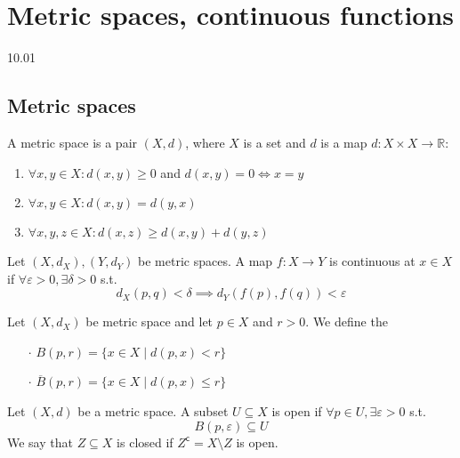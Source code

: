 \section{Metric spaces, continuous functions}
10.01

\subsection{Metric spaces}

\begin{definition}
  A metric space is a pair \( (X, d) \), where \( X \) is a set
  and \( d \) is a map \( d: X \times X \to \mathbb{R} \):
  \begin{enumerate}
    \item \( \forall x, y \in X : d(x, y) \ge 0 \) and \( d(x, y) = 0 \iff x = y \)
    \item \( \forall x, y \in X : d(x, y) = d(y, x) \)
    \item \( \forall x, y, z \in X : d(x, z) \ge d(x, y) + d(y, z) \)
  \end{enumerate}
\end{definition}

\begin{definition}[Continuity]
  Let \( (X, d_X), (Y, d_Y) \) be metric spaces.
  A map \( f: X \to Y \) is continuous at \( x \in X \)
  if \( \forall \varepsilon > 0, \exists \delta > 0\) s.t.
  \[
    d_X(p, q) < \delta \implies d_Y(f(p), f(q)) < \varepsilon
  \]
\end{definition}

\begin{definition}[Balls]
   Let \( (X, d_X) \) be metric space and let 
   \( p \in X \) and \( r > 0 \). We define the

   \begin{enumerate}
     \item[\(\cdot\)] \( B(p, r) = \{ x \in X \mid d(p, x) < r \}  \)
     \item[\(\cdot\)] \( \overline{B}(p, r) = \{ x \in X \mid d(p, x) \le r \} \)
   \end{enumerate}
\end{definition}

\begin{definition}
   Let \( (X, d) \) be a metric space.
   A subset \( U \subseteq X \) is open
   if \( \forall p \in U, \exists \varepsilon > 0 \) s.t.
   \[
    B(p, \varepsilon) \subseteq U
   \]
   We say that \( Z \subseteq X \) is closed
   if \( Z^\mathsf{c} = X \setminus Z \) is open.
\end{definition}

